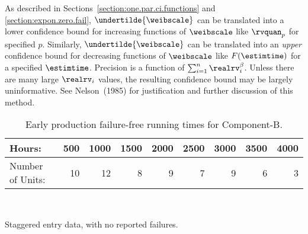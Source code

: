As described in Sections~\ref{section:one.par.ci.functions} and
\ref{section:expon.zero.fail}, 
$\undertilde{\weibscale}$ can be translated into a
lower confidence bound for increasing functions of $\weibscale$ like
$\rvquan_{p}$ for specified $p$.  Similarly, $\undertilde{\weibscale}$
can be translated into an {\em upper} confidence bound for decreasing
functions of $\weibscale$ like $F(\estimtime)$ for a specified
$\estimtime$. Precision is a function of $\sum_{i=1}^{n}
\realrv_{i}^{\beta}$.  Unless there are many large $\realrv_{i}$ values,
the resulting confidence bound may be largely uninformative.  See
Nelson~(1985) for justification and further discussion of this method.
\begin{table}
\caption{Early production failure-free running times for Component-B.}
\centering\small
\begin{tabular}{lrrrrrrrr}
\\[-.5ex]
\hline
Hours: & 500&1000&1500&2000&2500&3000&3500&4000\\
\hline
Number of Units: &  10 & 12 &  8&  9 &  7 &  9 &  6 &  3 \\
\hline
\end{tabular}\\
\begin{minipage}[t]{4in}
Staggered entry data, with no reported failures.
\end{minipage}
\label{table:component.a.results}
\end{table}
